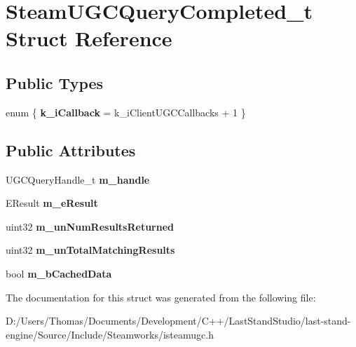 \hypertarget{structSteamUGCQueryCompleted__t}{}\section{Steam\+U\+G\+C\+Query\+Completed\+\_\+t Struct Reference}
\label{structSteamUGCQueryCompleted__t}
\subsection*{Public Types}
\begin{DoxyCompactItemize}
\item 
\hypertarget{structSteamUGCQueryCompleted__t_ac54f112606548c698bdb5d8efb7f2c95}{}enum \{ {\bfseries k\+\_\+i\+Callback} = k\+\_\+i\+Client\+U\+G\+C\+Callbacks + 1
 \}\label{structSteamUGCQueryCompleted__t_ac54f112606548c698bdb5d8efb7f2c95}

\end{DoxyCompactItemize}
\subsection*{Public Attributes}
\begin{DoxyCompactItemize}
\item 
\hypertarget{structSteamUGCQueryCompleted__t_ac02f5c90496db60a67bcad09dccdfe13}{}U\+G\+C\+Query\+Handle\+\_\+t {\bfseries m\+\_\+handle}\label{structSteamUGCQueryCompleted__t_ac02f5c90496db60a67bcad09dccdfe13}

\item 
\hypertarget{structSteamUGCQueryCompleted__t_a43819b9bf5dd770b0530509404b7d999}{}E\+Result {\bfseries m\+\_\+e\+Result}\label{structSteamUGCQueryCompleted__t_a43819b9bf5dd770b0530509404b7d999}

\item 
\hypertarget{structSteamUGCQueryCompleted__t_aa47577ef419a0679f9fa2ad43896bc62}{}uint32 {\bfseries m\+\_\+un\+Num\+Results\+Returned}\label{structSteamUGCQueryCompleted__t_aa47577ef419a0679f9fa2ad43896bc62}

\item 
\hypertarget{structSteamUGCQueryCompleted__t_a17da8fde1e0582013ce5602957afb7bf}{}uint32 {\bfseries m\+\_\+un\+Total\+Matching\+Results}\label{structSteamUGCQueryCompleted__t_a17da8fde1e0582013ce5602957afb7bf}

\item 
\hypertarget{structSteamUGCQueryCompleted__t_a034a7f44cc3e19bb58c8e8cce569a19a}{}bool {\bfseries m\+\_\+b\+Cached\+Data}\label{structSteamUGCQueryCompleted__t_a034a7f44cc3e19bb58c8e8cce569a19a}

\end{DoxyCompactItemize}


The documentation for this struct was generated from the following file\+:\begin{DoxyCompactItemize}
\item 
D\+:/\+Users/\+Thomas/\+Documents/\+Development/\+C++/\+Last\+Stand\+Studio/last-\/stand-\/engine/\+Source/\+Include/\+Steamworks/isteamugc.\+h\end{DoxyCompactItemize}
